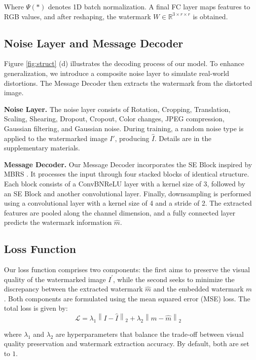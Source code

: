\documentclass{article}
\begin{document}
Where \( \Psi(*) \) denotes 1D batch normalization. A final FC layer maps features to RGB values, and after reshaping, the watermark $W \in \mathbb{R}^{3\times r \times r}$ is obtained.

\subsection{Noise Layer and Message Decoder}
Figure \ref{fig:struct} (d) illustrates the decoding process of our model. To enhance generalization, we introduce a composite noise layer to simulate real-world distortions. The Message Decoder then extracts the watermark from the distorted image.

\textbf{Noise Layer.} The noise layer consists of Rotation, Cropping, Translation, Scaling, Shearing, Dropout, Cropout, Color changes, JPEG compression, Gaussian filtering, and Gaussian noise. During training, a random noise type is applied to the watermarked image \( I' \), producing \( \hat{I} \). Details are in the supplementary materials.

\textbf{Message Decoder.} Our Message Decoder incorporates the SE Block \cite{hu2018squeeze} inspired by MBRS \cite{jia2021mbrs}. It processes the input through four stacked blocks of identical structure. Each block consists of a ConvBNReLU layer with a kernel size of 3, followed by an SE Block and another convolutional layer. Finally, downsampling is performed using a convolutional layer with a kernel size of 4 and a stride of 2. The extracted features are pooled along the channel dimension, and a fully connected layer predicts the watermark information \( \hat{m} \).

\subsection{Loss Function}
Our loss function comprises two components: the first aims to preserve the visual quality of the watermarked image $I^{'}$, while the second seeks to minimize the discrepancy between the extracted watermark \(\hat{m}\) and the embedded watermark \(m\). Both components are formulated using the mean squared error (MSE) loss. The total loss is given by:
\begin{equation}
    \mathcal{L} = \lambda_1 \left\| I - \hat{I} \right\|_2 + \lambda_2 \left\| m - \hat{m} \right\|_2
\end{equation}

where \( \lambda_1 \) and \( \lambda_2 \) are hyperparameters that balance the trade-off between visual quality preservation and watermark extraction accuracy. By default, both are set to $1$.
\end{document}
